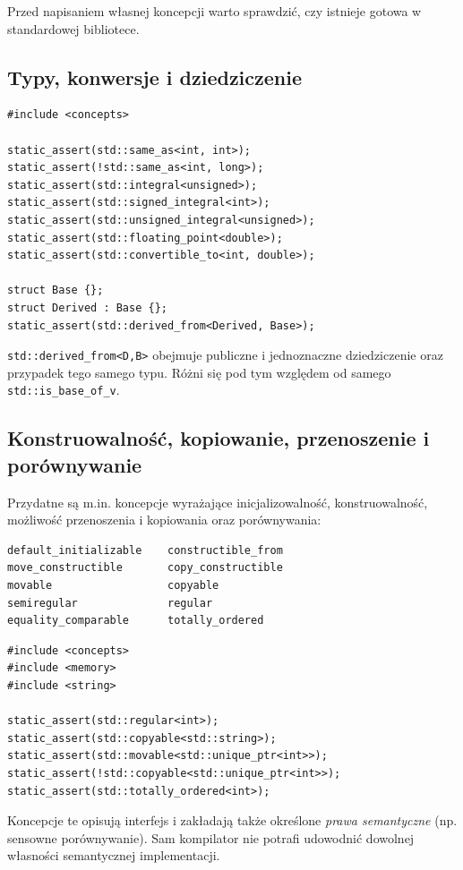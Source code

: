 Przed napisaniem własnej koncepcji warto sprawdzić, czy istnieje
gotowa w standardowej bibliotece.

\subsection{Typy, konwersje i dziedziczenie}

\begin{lstlisting}
#include <concepts>

static_assert(std::same_as<int, int>);
static_assert(!std::same_as<int, long>);
static_assert(std::integral<unsigned>);
static_assert(std::signed_integral<int>);
static_assert(std::unsigned_integral<unsigned>);
static_assert(std::floating_point<double>);
static_assert(std::convertible_to<int, double>);

struct Base {};
struct Derived : Base {};
static_assert(std::derived_from<Derived, Base>);
\end{lstlisting}

\texttt{std::derived\_from<D,B>} obejmuje publiczne i jednoznaczne
dziedziczenie oraz przypadek tego samego typu. Różni się pod tym
względem od samego \texttt{std::is\_base\_of\_v}.

\subsection{Konstruowalność, kopiowanie, przenoszenie i porównywanie}

Przydatne są m.in. koncepcje wyrażające inicjalizowalność,
konstruowalność, możliwość przenoszenia i kopiowania oraz porównywania:
\begin{lstlisting}
default_initializable    constructible_from
move_constructible       copy_constructible
movable                  copyable
semiregular              regular
equality_comparable      totally_ordered
\end{lstlisting}

\begin{lstlisting}
#include <concepts>
#include <memory>
#include <string>

static_assert(std::regular<int>);
static_assert(std::copyable<std::string>);
static_assert(std::movable<std::unique_ptr<int>>);
static_assert(!std::copyable<std::unique_ptr<int>>);
static_assert(std::totally_ordered<int>);
\end{lstlisting}

Koncepcje te opisują interfejs i zakładają także określone
\emph{prawa semantyczne} (np. sensowne porównywanie). Sam kompilator
nie potrafi udowodnić dowolnej własności semantycznej implementacji.

